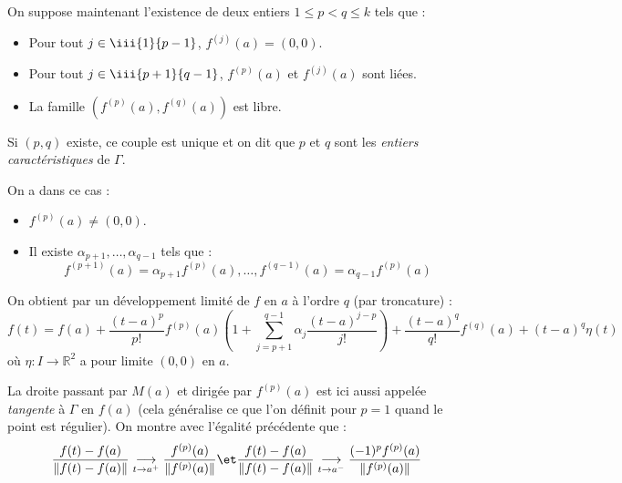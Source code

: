 \documentclass[french,11pt,twoside]{VcCours}
\begin{document}
\medskip

On suppose maintenant l'existence de deux entiers $1 \leq p <q \leq k$ tels que :
\begin{itemize}
\item Pour tout $j \in \iii{1}{p-1}$, $f^{(j)}(a)=(0,0)$.
\item Pour tout $j \in \iii{p+1}{q-1}$, $f^{(p)}(a)$ et $f^{(j)}(a)$ sont liées.
\item La famille $(f^{(p)}(a), f^{(q)}(a))$ est libre.
\end{itemize}

\medskip

Si $(p,q)$ existe, ce couple est unique et on dit que $p$ et $q$ sont les \emph{entiers caractéristiques} de $\Gamma$. 

\medskip

On a dans ce cas :

\begin{itemize}
\item $f^{(p)}(a) \neq (0,0)$.
\item Il existe $\alpha_{p+1}, \ldots, \alpha_{q-1}$ tels que :
$$ f^{(p+1)}(a) = \alpha_{p+1} f^{(p)}(a), \ldots,  f^{(q-1)}(a)= \alpha_{q-1} f^{(p)}(a)$$
\end{itemize}
On obtient par un développement limité de $f$ en $a$ à l'ordre $q$ (par troncature) : 
$$ f(t) =  f(a) + \dfrac{(t-a)^p}{p!} f^{(p)}(a) \left( 1 + \sum_{j=p+1}^{q-1} \alpha_j \dfrac{(t-a)^{j-p}}{j!} \right) + \dfrac{(t-a)^q}{q!} f^{(q)}(a) + (t-a)^q \eta(t)$$
où $\eta : I \rightarrow \mathbb{R}^2$ a pour limite $(0,0)$ en $a$.

\begin{Remarque}{} 
La droite passant par $M(a)$ et dirigée par $f^{(p)}(a)$ est ici aussi appelée 
\emph{tangente} à $\Gamma$ en $f(a)$ (cela généralise ce que l'on définit 
pour $p=1$ quand le point est régulier). On montre avec l'égalité précédente que :
$$ \dfrac{f(t)-f(a)}{\Vert f(t)-f(a) \Vert} \underset{t \rightarrow a^+}{\longrightarrow} 
\frac{f^{(p)}(a)}{\Vert f^{(p)}(a) \Vert} \et  \dfrac{f(t)-f(a)}{\Vert f(t)-f(a) \Vert} 
\underset{t \rightarrow a^-}{\longrightarrow} \frac{(-1)^p f^{(p)}(a)}{\Vert f^{(p)}(a) \Vert}$$
\end{Remarque}
\end{document}
